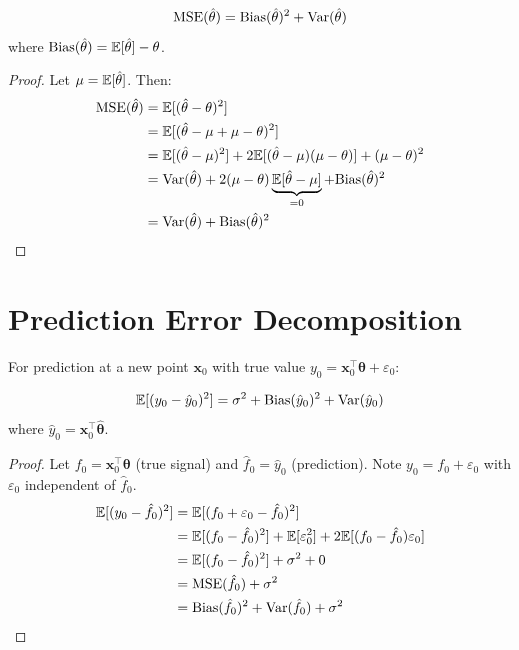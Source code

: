 \documentclass[main.tex]{subfiles}
\begin{document}
\begin{theorem}
$$\text{MSE}(\hat{\theta}) = \text{Bias}(\hat{\theta})^2 + \text{Var}(\hat{\theta})$$
where $\text{Bias}(\hat{\theta}) = \mathbb{E}[\hat{\theta}] - \theta$.
\end{theorem}

\begin{proof}
Let $\mu = \mathbb{E}[\hat{\theta}]$. Then:
\begin{align}
\text{MSE}(\hat{\theta}) &= \mathbb{E}[(\hat{\theta} - \theta)^2] \\
&= \mathbb{E}[(\hat{\theta} - \mu + \mu - \theta)^2] \\
&= \mathbb{E}[(\hat{\theta} - \mu)^2] + 2\mathbb{E}[(\hat{\theta} - \mu)(\mu - \theta)] + (\mu - \theta)^2 \\
&= \text{Var}(\hat{\theta}) + 2(\mu - \theta)\underbrace{\mathbb{E}[\hat{\theta} - \mu]}_{=0} + \text{Bias}(\hat{\theta})^2 \\
&= \text{Var}(\hat{\theta}) + \text{Bias}(\hat{\theta})^2
\end{align}
\end{proof}

\needspace{0.33\textheight}
\section{Prediction Error Decomposition}

For prediction at a new point $\mathbf{x}_0$ with true value $y_0 = \mathbf{x}_0^\top\boldsymbol{\theta} + \varepsilon_0$:

\begin{theorem}
$$\mathbb{E}[(y_0 - \hat{y}_0)^2] = \sigma^2 + \text{Bias}(\hat{y}_0)^2 + \text{Var}(\hat{y}_0)$$
where $\hat{y}_0 = \mathbf{x}_0^\top\hat{\boldsymbol{\theta}}$.
\end{theorem}

\begin{proof}
Let $f_0 = \mathbf{x}_0^\top\boldsymbol{\theta}$ (true signal) and $\hat{f}_0 = \hat{y}_0$ (prediction). Note $y_0 = f_0 + \varepsilon_0$ with $\varepsilon_0$ independent of $\hat{f}_0$.
\begin{align}
\mathbb{E}[(y_0 - \hat{f}_0)^2] &= \mathbb{E}[(f_0 + \varepsilon_0 - \hat{f}_0)^2] \\
&= \mathbb{E}[(f_0 - \hat{f}_0)^2] + \mathbb{E}[\varepsilon_0^2] + 2\mathbb{E}[(f_0 - \hat{f}_0)\varepsilon_0] \\
&= \mathbb{E}[(f_0 - \hat{f}_0)^2] + \sigma^2 + 0 \\
&= \text{MSE}(\hat{f}_0) + \sigma^2 \\
&= \text{Bias}(\hat{f}_0)^2 + \text{Var}(\hat{f}_0) + \sigma^2
\end{align}
\end{proof}
\end{document}
